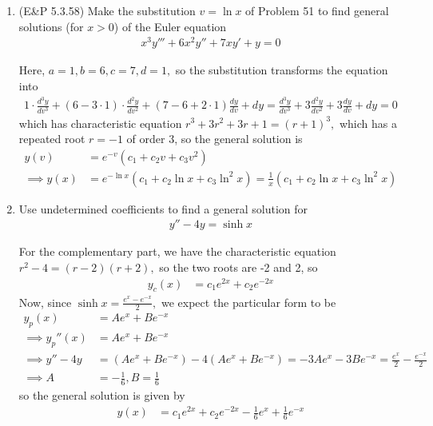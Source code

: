 \documentclass{article}
\begin{document}
\begin{enumerate}
	\item (E\&P 5.3.58) Make the substitution $v=\ln x$ of Problem 51 to find general solutions (for $x>0$) of the Euler equation
		\begin{align*}
			x^3y'''+6x^2y''+7xy'+y=0
		\end{align*}
		\begin{soln}
			Here, $a=1, b=6, c=7, d=1,$ so the substitution transforms the equation into
			\begin{align*}
				1\cdot\frac{d^3y}{dv^3} + (6-3\cdot 1)\cdot \frac{d^2y}{dv^2} + (7-6+2\cdot 1) \frac{dy}{dv} + dy = \frac{d^3y}{dv^3} + 3\frac{d^2y}{dv^2} + 3\frac{dy}{dv} + dy = 0
			\end{align*}
			which has characteristic equation $r^3+3r^2+3r+1=(r+1)^3,$ which has a repeated root $r=-1$ of order 3, so the general solution is
			\begin{align*}
				y(v) &= e^{-v} \left( c_1+c_2v+c_3v^2 \right) \\
				\implies y(x) &= e^{-\ln x} \left( c_1+c_2\ln x + c_3\ln^2 x \right) = \frac{1}{x}\left( c_1+c_2\ln x + c_3\ln^2 x \right)
			\end{align*}
		\end{soln}

	\item Use undetermined coefficients to find a general solution for 
		\begin{align*}
			y''-4y = \sinh x
		\end{align*}
		\begin{soln}
			For the complementary part, we have the characteristic equation $r^2-4=(r-2)(r+2),$ so the two roots are -2 and 2, so 
			\begin{align*}
				y_c(x) &= c_1e^{2x} + c_2e^{-2x}
			\end{align*}
			Now, since $\sinh x = \frac{e^{x}-e^{-x}}{2},$ we expect the particular form to be
			\begin{align*}
				y_p(x) &= Ae^x + Be^{-x} \\
				\implies y_p''(x) &= Ae^x + Be^{-x} \\
				\implies y'' - 4y &= (Ae^x + Be^{-x}) - 4(Ae^x + Be^{-x}) = -3Ae^x - 3Be^{-x} = \frac{e^x}{2} - \frac{e^{-x}}{2} \\
				\implies A &= -\frac{1}{6}, B = \frac{1}{6}
			\end{align*}
			so the general solution is given by
			\begin{align*}
				y(x) &= c_1e^{2x} + c_2e^{-2x} - \frac{1}{6}e^x + \frac{1}{6}e^{-x}
			\end{align*}
		\end{soln}


\end{enumerate}
\end{document}
